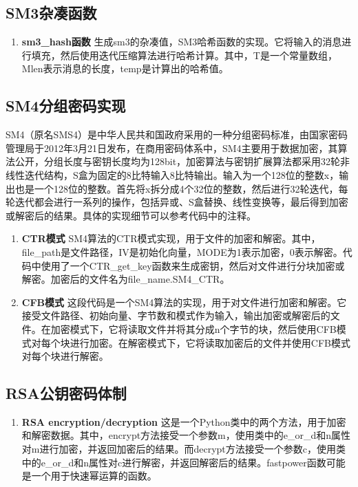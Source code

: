 \documentclass{article}
\begin{document}
\begin{sloppypar}
	\subsection{SM3杂凑函数}
	\begin{enumerate}
		\item \textbf{sm3\_hash函数}
		生成sm3的杂凑值，SM3哈希函数的实现。它将输入的消息进行填充，然后使用迭代压缩算法进行哈希计算。其中，T是一个常量数组，Mlen表示消息的长度，temp是计算出的哈希值。
		
		
	\end{enumerate}
	\subsection{SM4分组密码实现}
	SM4（原名SMS4）是中华人民共和国政府采用的一种分组密码标准，由国家密码管理局于2012年3月21日发布，在商用密码体系中，SM4主要用于数据加密，其算法公开，分组长度与密钥长度均为128bit，加密算法与密钥扩展算法都采用32轮非线性迭代结构，S盒为固定的8比特输入8比特输出。输入为一个128位的整数x，输出也是一个128位的整数。首先将x拆分成4个32位的整数，然后进行32轮迭代，每轮迭代都会进行一系列的操作，包括异或、S盒替换、线性变换等，最后得到加密或解密后的结果。具体的实现细节可以参考代码中的注释。
	\begin{enumerate}
		\item \textbf{CTR模式}
		SM4算法的CTR模式实现，用于文件的加密和解密。其中，file\_path是文件路径，IV是初始化向量，MODE为1表示加密，0表示解密。代码中使用了一个CTR\_get\_key函数来生成密钥，然后对文件进行分块加密或解密。加密后的文件名为file\_name.SM4\_CTR。
		\item \textbf{CFB模式}
		这段代码是一个SM4算法的实现，用于对文件进行加密和解密。它接受文件路径、初始向量、字节数和模式作为输入，输出加密或解密后的文件。在加密模式下，它将读取文件并将其分成n个字节的块，然后使用CFB模式对每个块进行加密。在解密模式下，它将读取加密后的文件并使用CFB模式对每个块进行解密。
		
		
	\end{enumerate}
	\subsection{RSA公钥密码体制}
	\begin{enumerate}
		\item \textbf{RSA encryption/decryption}
		这是一个Python类中的两个方法，用于加密和解密数据。其中，encrypt方法接受一个参数m，使用类中的e\_or\_d和n属性对m进行加密，并返回加密后的结果。而decrypt方法接受一个参数c，使用类中的e\_or\_d和n属性对c进行解密，并返回解密后的结果。fastpower函数可能是一个用于快速幂运算的函数。
		

\end{enumerate}
\end{sloppypar}
\end{document}
